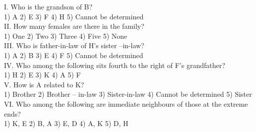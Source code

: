 \documentclass[
]{article}
\begin{document}
I. Who is the grandson of B?\\
1) A \hspace{2mm}2) E \hspace{2mm}3) F \hspace{2mm}4) H \hspace{2mm}5) Cannot be determined\\

II. How many females are there in the family?\\
1) One \hspace{2mm}2) Two \hspace{2mm}3) Three \hspace{2mm}4) Five \hspace{2mm}5) None\\

III. Who is father-in-law of H’s sister –in-law?\\
1) A \hspace{2mm}2) B \hspace{2mm}3) E \hspace{2mm}4) F \hspace{2mm}5) Cannot be determined\\

IV. Who among the following sits fourth to the right of F’s grandfather?\\
1) H \hspace{2mm}2) E \hspace{2mm}3) K \hspace{2mm}4) A \hspace{2mm}5) F\\

V. How is A related to K?\\
1) Brother \hspace{2mm}2) Brother – in-law \hspace{2mm}3) Sister-in-law
\hspace{2mm}4) Cannot be determined \hspace{2mm}5) Sister\\

VI. Who among the following are immediate neighbours of those at the extreme ends?\\
1) K, E \hspace{2mm}2) B, A \hspace{2mm}3) E, D \hspace{2mm}4) A, K \hspace{2mm}5) D, H\\
\end{document}
